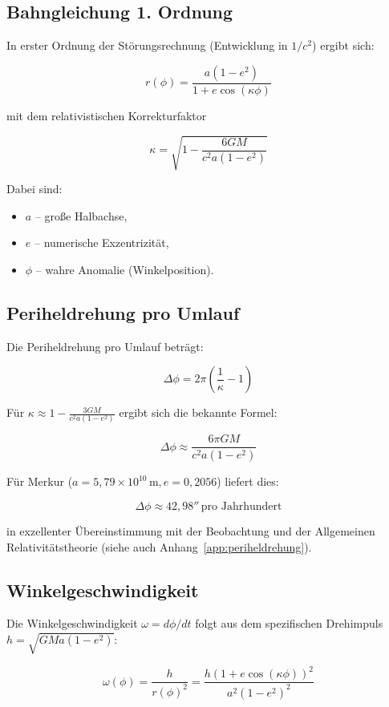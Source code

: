 \subsection{Bahngleichung 1. Ordnung}
\label{sub:weber_bahn_1ordnung}

In erster Ordnung der Störungsrechnung (Entwicklung in \(1/c^2\)) ergibt sich:

\[
r(\phi) = \frac{a(1-e^2)}{1 + e \cos(\kappa\phi)}
\]

mit dem relativistischen Korrekturfaktor

\[
\kappa = \sqrt{1 - \frac{6GM}{c^2 a(1-e^2)}}
\]

Dabei sind:
\begin{itemize}
    \item \(a\) – große Halbachse,
    \item \(e\) – numerische Exzentrizität,
    \item \(\phi\) – wahre Anomalie (Winkelposition).
\end{itemize}

\subsection{Periheldrehung pro Umlauf}
\label{sub:weber_periheldrehung}

Die Periheldrehung pro Umlauf beträgt:

\[
\Delta\phi = 2\pi\left(\frac{1}{\kappa} - 1\right)
\]

Für \(\kappa \approx 1 - \frac{3GM}{c^2 a(1-e^2)}\) ergibt sich die bekannte Formel:

\[
\Delta\phi \approx \frac{6\pi GM}{c^2 a(1-e^2)}
\]

Für Merkur (\(a = 5,79 \times 10^{10} \, \text{m}, e = 0,2056\)) liefert dies:

\[
\Delta\phi \approx 42,98'' \, \text{pro Jahrhundert}
\]

in exzellenter Übereinstimmung mit der Beobachtung und der Allgemeinen Relativitätstheorie (siehe auch Anhang~\ref{app:periheldrehung}).

\subsection{Winkelgeschwindigkeit}
\label{sub:weber_winkelgeschw}

Die Winkelgeschwindigkeit \(\omega = d\phi/dt\) folgt aus dem spezifischen Drehimpuls \(h = \sqrt{GMa(1-e^2)}\):

\[
\omega(\phi) = \frac{h}{r(\phi)^2} = \frac{h (1 + e \cos(\kappa\phi))^2}{a^2 (1-e^2)^2}
\]

